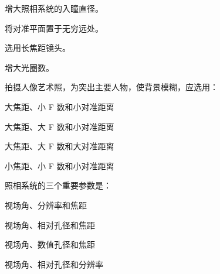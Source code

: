 \documentclass[standard, analysis, notocnum]{ExBook}
\newcommand{\answerarea}[1][8cm]{%
  \par\vspace{2mm}%
  \noindent{\color{themeColor!35}\rule{\linewidth}{0.4pt}}\par
  \noindent\begin{minipage}[t][#1][t]{\linewidth}\vspace{0pt}\end{minipage}\par
  \noindent{\color{themeColor!35}\rule{\linewidth}{0.4pt}}\par
}
\begin{document}
\begin{qitems}
\begin{bbox}
\par\noindent\hspace{2em}增大照相系统的入瞳直径。
\par\noindent\hspace{2em}将对准平面置于无穷远处。
\par\noindent\hspace{2em}选用长焦距镜头。
\par\noindent\hspace{2em}增大光圈数。
\answerarea[3.5cm]
\end{bbox}
\begin{bbox}
\qitem 拍摄人像艺术照，为突出主要人物，使背景模糊，应选用：
\par\noindent\hspace{2em}大焦距、小 F 数和小对准距离
\par\noindent\hspace{2em}大焦距、大 F 数和小对准距离
\par\noindent\hspace{2em}大焦距、大 F 数和大对准距离
\par\noindent\hspace{2em}小焦距、小 F 数和小对准距离
\answerarea[3.5cm]
\end{bbox}
\begin{bbox}
\qitem 照相系统的三个重要参数是：
\par\noindent\hspace{2em}视场角、分辨率和焦距
\par\noindent\hspace{2em}视场角、相对孔径和焦距
\par\noindent\hspace{2em}视场角、数值孔径和焦距
\par\noindent\hspace{2em}视场角、相对孔径和分辨率
\answerarea[3.5cm]
\end{bbox}
\end{qitems}
\end{document}
